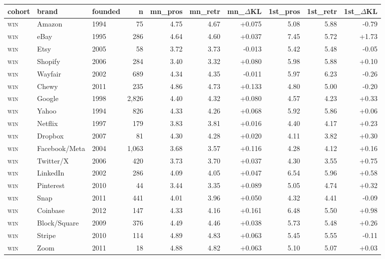 \begin{tabular}{lllrrrrrrr}
\toprule
\textbf{cohort} & \textbf{brand} & \textbf{founded} & \textbf{n} & \textbf{mn\_pros} & \textbf{mn\_retr} & \textbf{mn\_$\Delta$KL} & \textbf{1st\_pros} & \textbf{1st\_retr} & \textbf{1st\_$\Delta$KL} \\
\midrule
\textsc{win} & Amazon & 1994 & 75 & 4.75 & 4.67 & +0.075 & 5.08 & 5.88 & -0.79 \\
\textsc{win} & eBay & 1995 & 286 & 4.64 & 4.60 & +0.037 & 7.45 & 5.72 & +1.73 \\
\textsc{win} & Etsy & 2005 & 58 & 3.72 & 3.73 & -0.013 & 5.42 & 5.48 & -0.05 \\
\textsc{win} & Shopify & 2006 & 284 & 3.40 & 3.32 & +0.080 & 5.98 & 5.88 & +0.10 \\
\textsc{win} & Wayfair & 2002 & 689 & 4.34 & 4.35 & -0.011 & 5.97 & 6.23 & -0.26 \\
\textsc{win} & Chewy & 2011 & 235 & 4.86 & 4.73 & +0.133 & 4.80 & 5.00 & -0.20 \\
\textsc{win} & Google & 1998 & 2,826 & 4.40 & 4.32 & +0.080 & 4.57 & 4.23 & +0.33 \\
\textsc{win} & Yahoo & 1994 & 826 & 4.33 & 4.26 & +0.068 & 5.92 & 5.86 & +0.06 \\
\textsc{win} & Netflix & 1997 & 179 & 3.83 & 3.81 & +0.016 & 4.40 & 4.17 & +0.23 \\
\textsc{win} & Dropbox & 2007 & 81 & 4.30 & 4.28 & +0.020 & 4.11 & 3.82 & +0.30 \\
\textsc{win} & Facebook/Meta & 2004 & 1,063 & 3.68 & 3.57 & +0.116 & 4.28 & 4.12 & +0.16 \\
\textsc{win} & Twitter/X & 2006 & 420 & 3.73 & 3.70 & +0.037 & 4.30 & 3.55 & +0.75 \\
\textsc{win} & LinkedIn & 2002 & 286 & 4.09 & 4.05 & +0.047 & 6.54 & 5.96 & +0.58 \\
\textsc{win} & Pinterest & 2010 & 44 & 3.44 & 3.35 & +0.089 & 5.05 & 4.74 & +0.32 \\
\textsc{win} & Snap & 2011 & 441 & 4.01 & 3.96 & +0.050 & 4.32 & 4.41 & -0.09 \\
\textsc{win} & Coinbase & 2012 & 147 & 4.33 & 4.16 & +0.161 & 6.48 & 5.50 & +0.98 \\
\textsc{win} & Block/Square & 2009 & 376 & 4.49 & 4.46 & +0.038 & 5.73 & 5.48 & +0.26 \\
\textsc{win} & Stripe & 2010 & 114 & 4.89 & 4.83 & +0.063 & 5.45 & 5.55 & -0.11 \\
\textsc{win} & Zoom & 2011 & 18 & 4.88 & 4.82 & +0.063 & 5.10 & 5.07 & +0.03 \\

\end{tabular}
